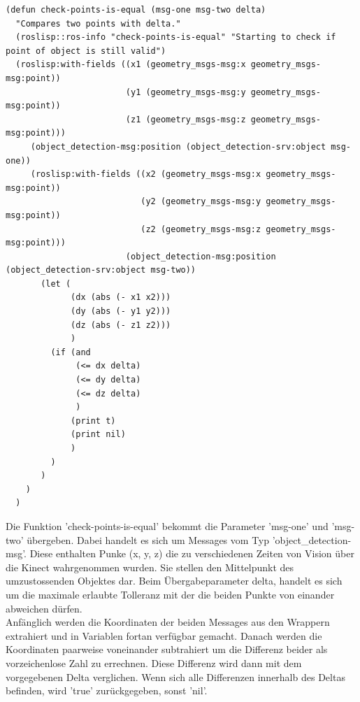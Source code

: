 \documentclass{suturo}
\begin{document}
\noindent
\begin{minipage}{\linewidth}
\begin{lstlisting}
(defun check-points-is-equal (msg-one msg-two delta)
  "Compares two points with delta."
  (roslisp::ros-info "check-points-is-equal" "Starting to check if point of object is still valid")
  (roslisp:with-fields ((x1 (geometry_msgs-msg:x geometry_msgs-msg:point)) 
                        (y1 (geometry_msgs-msg:y geometry_msgs-msg:point))
                        (z1 (geometry_msgs-msg:z geometry_msgs-msg:point)))
     (object_detection-msg:position (object_detection-srv:object msg-one))
     (roslisp:with-fields ((x2 (geometry_msgs-msg:x geometry_msgs-msg:point)) 
                           (y2 (geometry_msgs-msg:y geometry_msgs-msg:point))
                           (z2 (geometry_msgs-msg:z geometry_msgs-msg:point)))
                        (object_detection-msg:position (object_detection-srv:object msg-two))
       (let (
             (dx (abs (- x1 x2)))
             (dy (abs (- y1 y2)))
             (dz (abs (- z1 z2)))
             )
         (if (and
              (<= dx delta)
              (<= dy delta)
              (<= dz delta)
              )
             (print t)
             (print nil)
             )
         )
       )
    )
  )
\end{lstlisting}
\end{minipage}

Die Funktion 'check-points-is-equal' bekommt die Parameter 'msg-one' und 'msg-two' \"ubergeben. Dabei handelt es sich um Messages vom Typ 'object\_detection-msg'. Diese enthalten Punke (x, y, z) die zu verschiedenen Zeiten von Vision über die Kinect wahrgenommen wurden. Sie stellen den Mittelpunkt des umzustossenden Objektes dar. Beim \"Ubergabeparameter delta, handelt es sich um die maximale erlaubte Tolleranz mit der die beiden Punkte von einander abweichen dürfen. \\
Anf\"anglich werden die Koordinaten der beiden Messages aus den Wrappern extrahiert und in Variablen fortan verf\"ugbar gemacht. Danach werden die Koordinaten paarweise voneinander subtrahiert um die Differenz beider als vorzeichenlose Zahl zu errechnen. Diese Differenz wird dann mit dem vorgegebenen Delta verglichen. Wenn sich alle Differenzen innerhalb des Deltas befinden, wird 'true' zurückgegeben, sonst 'nil'. 
\end{document}
